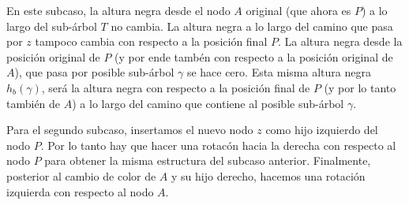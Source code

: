 \documentclass[10pt,a4paper]{article}
\begin{document}
\hspace{1cm}
\hspace{1cm}
\vspace{1cm}

En este subcaso, la altura negra desde el nodo $A$ original (que ahora es $P$) a lo largo del sub-\'arbol $T$ no cambia. La altura negra a lo largo del camino que pasa por $z$ tampoco cambia con respecto a la posici\'on final $P$. La altura negra desde la posici\'on original de $P$ (y por ende tamb\'en con respecto a la posici\'on original de $A$), que pasa por posible sub-\'arbol $\gamma$ se hace cero. Esta misma altura negra $h_b(\gamma)$, ser\'a la altura negra con respecto a la posici\'on final de $P$ (y por lo tanto tambi\'en de $A$) a lo largo del camino que contiene al posible sub-\'arbol $\gamma$.\newline 

Para el segundo subcaso, insertamos el nuevo nodo $z$ como hijo izquierdo del nodo $P$. Por lo tanto hay que hacer una rotac\'on hacia la derecha con respecto al nodo $P$ para obtener la misma estructura del subcaso anterior. Finalmente, posterior al cambio de color de $A$ y su hijo derecho, hacemos una rotaci\'on izquierda con respecto al nodo $A$.
\end{document}
